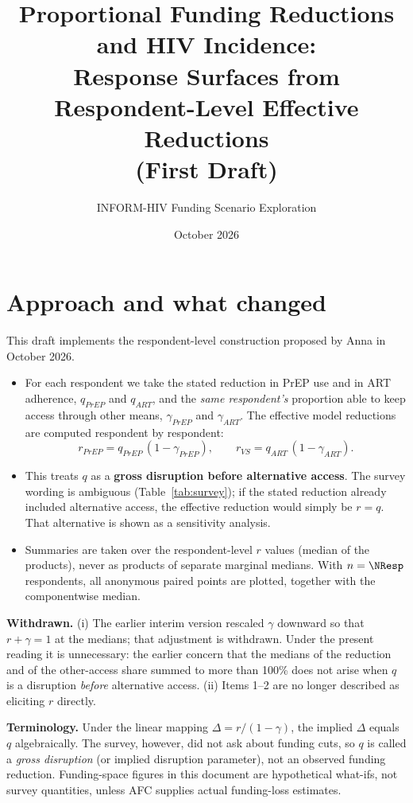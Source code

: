 \documentclass[10pt,a4paper]{article}
\title{Proportional Funding Reductions and HIV Incidence:\\Response Surfaces from Respondent-Level Effective Reductions\\(First Draft)}
\author{INFORM-HIV Funding Scenario Exploration}
\date{October 2026}
\begin{document}
\maketitle
\DataBanner

\section{Approach and what changed}
This draft implements the respondent-level construction proposed by Anna in October 2026.
\begin{itemize}[nosep]
\item For each respondent we take the stated reduction in PrEP use and in ART adherence, $q_{PrEP}$ and $q_{ART}$, and the \emph{same respondent's} proportion able to keep access through other means, $\gamma_{PrEP}$ and $\gamma_{ART}$. The effective model reductions are computed respondent by respondent:
\[
 r_{PrEP}=q_{PrEP}\,(1-\gamma_{PrEP}),\qquad r_{VS}=q_{ART}\,(1-\gamma_{ART}).
\]
\item This treats $q$ as a \textbf{gross disruption before alternative access}. The survey wording is ambiguous (Table~\ref{tab:survey}); if the stated reduction already included alternative access, the effective reduction would simply be $r=q$. That alternative is shown as a sensitivity analysis.
\item Summaries are taken over the respondent-level $r$ values (median of the products), never as products of separate marginal medians. With $n=\NResp$ respondents, all anonymous paired points are plotted, together with the componentwise median.
\end{itemize}
\textbf{Withdrawn.} (i) The earlier interim version rescaled $\gamma$ downward so that $r+\gamma=1$ at the medians; that adjustment is withdrawn. Under the present reading it is unnecessary: the earlier concern that the medians of the reduction and of the other-access share summed to more than 100\% does not arise when $q$ is a disruption \emph{before} alternative access. (ii) Items 1--2 are no longer described as eliciting $r$ directly.

\textbf{Terminology.} Under the linear mapping $\Delta=r/(1-\gamma)$, the implied $\Delta$ equals $q$ algebraically. The survey, however, did not ask about funding cuts, so $q$ is called a \emph{gross disruption} (or implied disruption parameter), not an observed funding reduction. Funding-space figures in this document are hypothetical what-ifs, not survey quantities, unless AFC supplies actual funding-loss estimates.
\end{document}

